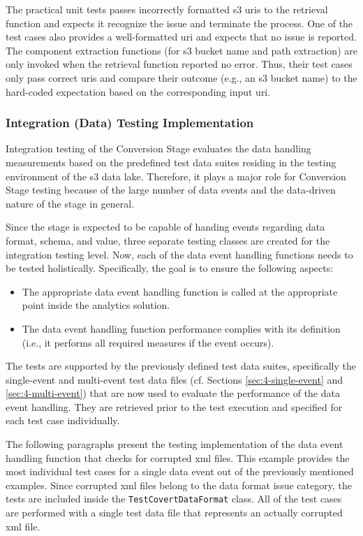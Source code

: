The practical unit tests passes incorrectly formatted \ac{s3} \acp{uri} to the retrieval function and expects it recognize the issue and terminate the process. One of the test cases also provides a well-formatted \ac{uri} and expects that no issue is reported. The component extraction functions (for \ac{s3} bucket name and path extraction) are only invoked when the retrieval function reported no error. Thus, their test cases only pass correct \acp{uri} and compare their outcome (e.g., an \ac{s3} bucket name) to the hard-coded expectation based on the corresponding input \ac{uri}.

\subsubsection{Integration (Data) Testing Implementation} \label{sec:5-3-3-2}
Integration testing of the Conversion Stage evaluates the data handling measurements based on the predefined test data suites residing in the testing environment of the \ac{s3} data lake. Therefore, it plays a major role for Conversion Stage testing because of the large number of data events and the data-driven nature of the stage in general.

Since the stage is expected to be capable of handing events regarding data format, schema, and value, three separate testing classes are created for the integration testing level. Now, each of the data event handling functions needs to be tested holistically. Specifically, the goal is to ensure the following aspects:

\begin{itemize}
	\item The appropriate data event handling function is called at the appropriate point inside the analytics solution.
	\item The data event handling function performance complies with its definition (i.e., it performs all required measures if the event occurs).
\end{itemize}

The tests are supported by the previously defined test data suites, specifically the single-event and multi-event test data files (cf. Sections \ref{sec:4-single-event} and \ref{sec:4-multi-event}) that are now used to evaluate the performance of the data event handling. They are retrieved prior to the test execution and specified for each test case individually.

The following paragraphs present the testing implementation of the data event handling function that checks for corrupted \ac{xml} files. This example provides the most individual test cases for a single data event out of the previously mentioned examples. Since corrupted \ac{xml} files belong to the data format issue category, the tests are included inside the \texttt{TestCovertDataFormat} class. All of the test cases are performed with a single test data file that represents an actually corrupted \ac{xml} file.

